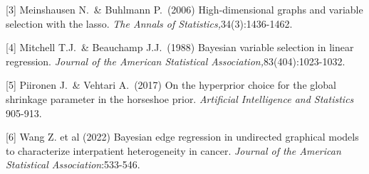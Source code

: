 \documentclass{article}
\begin{document}
[3] Meinshausen N.\ \& Buhlmann P.\ (2006) High-dimensional graphs and variable selection with the lasso. {\it The Annals of Statistics,}34(3):1436-1462.

[4] Mitchell T.J.\ \& Beauchamp J.J.\ (1988) Bayesian variable selection in linear regression. {\it Journal of the American Statistical Association,}83(404):1023-1032.

[5] Piironen J.\ \& Vehtari A.\ (2017) On the hyperprior choice for the global shrinkage parameter in the horseshoe prior. {\it Artificial Intelligence and Statistics} 905-913.

[6] Wang Z. et al (2022) Bayesian edge regression in undirected graphical models to characterize interpatient heterogeneity in cancer. {\it Journal of the American Statistical Association}:533-546.
\end{document}
